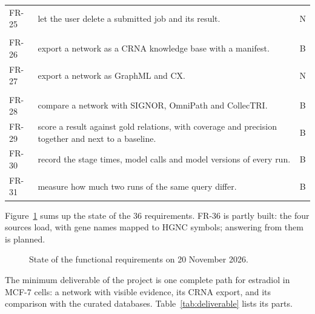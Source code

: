 \documentclass[11pt,a4paper]{article}
\begin{document}
{\begin{longtable}{@{}p{1.2cm}p{12.6cm}c@{}}
FR-25 & let the user delete a submitted job and its result. & N\\
\addlinespace
\multicolumn{3}{@{}l}{\textbf{Export}}\\
FR-26 & export a network as a CRNA knowledge base with a manifest. & B\\
FR-27 & export a network as GraphML and CX. & N\\
\addlinespace
\multicolumn{3}{@{}l}{\textbf{Evaluation and records}}\\
FR-28 & compare a network with SIGNOR, OmniPath and CollecTRI. & B\\
FR-29 & score a result against gold relations, with coverage and precision together and next to a baseline. & B\\
FR-30 & record the stage times, model calls and model versions of every run. & B\\
FR-31 & measure how much two runs of the same query differ. & B\\
\end{longtable}}

Figure~\ref{fig:status} sums up the state of the 36 requirements. FR-36 is partly built: the
four sources load, with gene names mapped to HGNC symbols; answering from them is planned.

\begin{figure}[htbp]
\centering
{}
\caption{State of the functional requirements on 20 November 2026.}
\label{fig:status}
\end{figure}

The minimum deliverable of the project is one complete path for estradiol in MCF-7 cells: a
network with visible evidence, its CRNA export, and its comparison with the curated databases.
Table~\ref{tab:deliverable} lists its parts.
\end{document}
